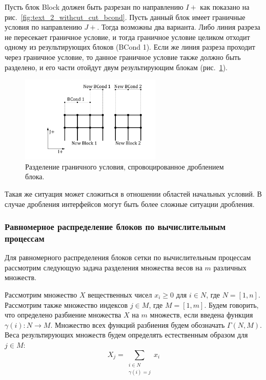 Пусть блок Block должен быть разрезан по направлению $I+$ как показано на рис.~\ref{fig:text_2_withcut_cut_bcond}.
Пусть данный блок имеет граничные условия по направлению $J+$.
Тогда возможны два варианта.
Либо линия разреза не пересекает граничное условие, и тогда граничное условие целиком отходит одному из результирующих блоков (BCond 1).
Если же линия разреза проходит через граничное условие, то данное граничное условие также должно быть разделено, и его части отойдут двум результирующим блокам (рис.~\ref{fig:text_2_withcut_cut_bcond2}).

\begin{figure}[ht]
	\centering
	\includegraphics[width=0.6\textwidth]{./pics/text_2_withcut/cut-bcond2.pdf}
	\caption{Разделение граничного условия, спровоцированное дроблением блока.}
	\label{fig:text_2_withcut_cut_bcond2}
\end{figure}

Такая же ситуация может сложиться в отношении областей начальных условий.
В случае дробления интерфейсов могут быть более сложные ситуации дробления.

\subsubsection{Равномерное распределение блоков по вычислительным процессам}

Для равномерного распределения блоков сетки по вычислительным процессам рассмотрим следующую задача разделения множества весов на $m$ различных множеств.

Рассмотрим множество $X$ вещественных чисел $x_i \ge 0$ для $i \in N$, где $N = [1, n]$.
Рассмотрим также множество индексов $j \in M$, где $M = [1, m]$.
Будем говорить, что определено разбиение множества $X$ на $m$ множеств, если введена функция $\gamma(i): N \rightarrow M$.
Множество всех функций разбиения будем обозначать $\Gamma(N, M)$.
Веса результирующих множеств будем определять естественным образом для $j \in M$:
\begin{equation}
	X_j = \sum_{\substack{i \in N \\ \gamma(i) = j}}{x_i}
\end{equation}

